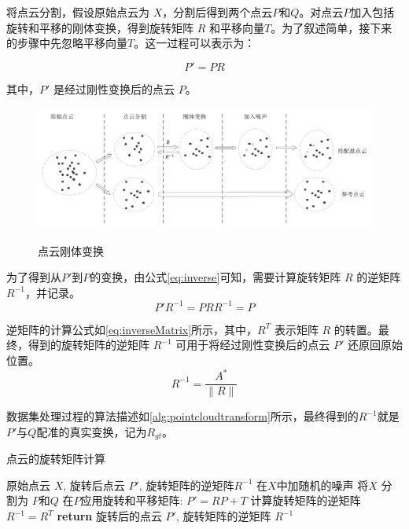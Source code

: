 将点云分割，假设原始点云为 $X$，分割后得到两个点云$P$和$Q$。对点云$P$加入包括旋转和平移的刚体变换，得到旋转矩阵 $R$ 和平移向量$T$。为了叙述简单，接下来的步骤中先忽略平移向量$T$。这一过程可以表示为：

\begin{equation}
P' = PR
\end{equation}

其中，\(P'\) 是经过刚性变换后的点云 \(P\)。
\begin{figure}[htbp]
	\centering
	\includegraphics[width=0.96\linewidth]{figures/点云变换.pdf}\\
	\caption{点云刚体变换}
	\label{点云变换}
\end{figure}

为了得到从$P'$到$P$的变换，由公式\eqref{eq:inverse}可知，需要计算旋转矩阵 \(R\) 的逆矩阵 \(R^{-1}\)，并记录。
\begin{equation}
	\label{eq:inverse}
P'R^{-1} = PRR^{-1} = P
\end{equation}

逆矩阵的计算公式如\eqref{eq:inverseMatrix}所示，其中，\(R^T\) 表示矩阵 \(R\) 的转置。最终，得到的旋转矩阵的逆矩阵 \(R^{-1}\) 可用于将经过刚性变换后的点云 \(P'\) 还原回原始位置。
\begin{equation}
	\label{eq:inverseMatrix}
R^{-1} = \frac{A^*}{\|R\|}
\end{equation}

数据集处理过程的算法描述如\ref{alg:pointcloudtransform}所示，最终得到的$R^{-1}$就是$P'$与$Q$配准的真实变换，记为$R_{gt}$。
 
\begin{algorithm}[htbp]
	\caption{点云的旋转矩阵计算}
	\label{alg:pointcloudtransform}
	\begin{algorithmic}[1]
		\Require 原始点云 $X$,
		\Ensure 旋转后点云 $P'$, 旋转矩阵的逆矩阵$R^{-1}$
		\State 在$X$中加随机的噪声
		\State 将$X$ 分割为 $P$和$Q$
		\State 在$P$应用旋转和平移矩阵: $P' = RP + T$
		\State 计算旋转矩阵的逆矩阵$R^{-1} = R^T$
		\State \textbf{return} 旋转后的点云 $P'$, 旋转矩阵的逆矩阵 $R^{-1}$
	\end{algorithmic}
\end{algorithm}


